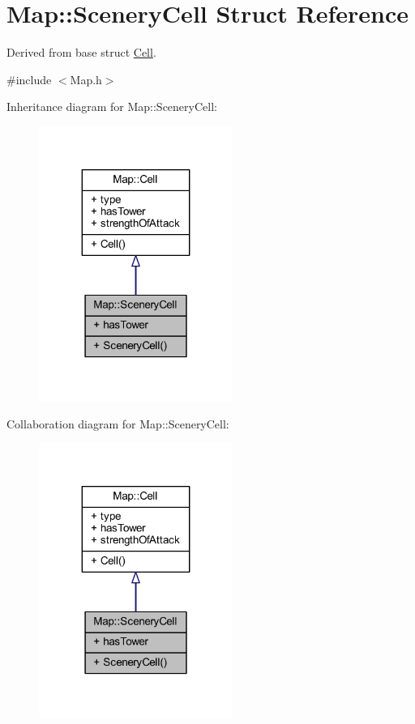 \hypertarget{struct_map_1_1_scenery_cell}{\section{Map\+:\+:Scenery\+Cell Struct Reference}
\label{struct_map_1_1_scenery_cell}
}


Derived from base struct \hyperlink{struct_map_1_1_cell}{Cell}.  




{\ttfamily \#include $<$Map.\+h$>$}



Inheritance diagram for Map\+:\+:Scenery\+Cell\+:
\nopagebreak
\begin{figure}[H]
\begin{center}
\leavevmode
\includegraphics[width=179pt]{struct_map_1_1_scenery_cell__inherit__graph}
\end{center}
\end{figure}


Collaboration diagram for Map\+:\+:Scenery\+Cell\+:
\nopagebreak
\begin{figure}[H]
\begin{center}
\leavevmode
\includegraphics[width=179pt]{struct_map_1_1_scenery_cell__coll__graph}
\end{center}
\end{figure}
